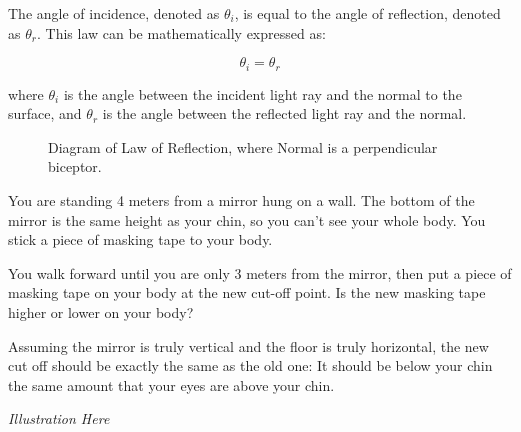 \begin{mdframed}[style=important, frametitle={Law of Reflection}]
The angle of incidence, denoted as $\theta_i$, is equal to
the angle of reflection, denoted as $\theta_r$. This law can be
mathematically expressed as:

$$\theta_i = \theta_r$$
 
where $\theta_i$ is the angle between the incident light ray and the
normal to the surface, and $\theta_r$ is the angle between the
reflected light ray and the normal.

\begin{figure}[htbp]
    \centering
    \caption{Diagram of Law of Reflection, where Normal is a perpendicular biceptor.}
    \label{fig:tikzLawOfReflection}
\end{figure}

\end{mdframed}

\begin{Exercise}[title={Law of Reflection}, label=law_of_reflection]

  You are standing 4 meters from a mirror hung on a wall. The bottom
  of the mirror is the same height as your chin, so you can't see your
  whole body. You stick a piece of masking tape to your body.

  You walk forward until you are only 3 meters from the mirror, then
  put a piece of masking tape on your body at the new cut-off point. Is the new
  masking tape higher or lower on your body?
  
\end{Exercise}
\begin{Answer}[ref=law_of_reflection]

 Assuming the mirror is truly vertical and the floor is truly
 horizontal, the new cut off should be exactly the same as the old
 one: It should be below your chin the same amount that your eyes are
 above your chin.

 \textit{Illustration Here}

\end{Answer}

